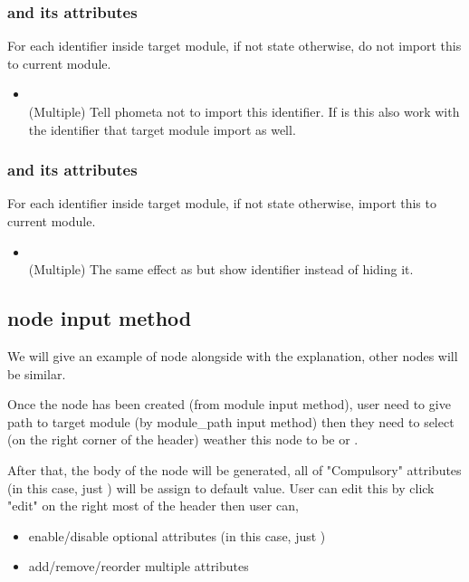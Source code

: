 \documentclass[master.tex]{subfiles}
\begin{document}
\subsubsection{\kShowByDefault and its attributes}
For each identifier inside target module, if not state otherwise, do not import this to current module.
\begin{itemize}
    \item \kHide {} \\
    (Multiple) Tell phometa not to import this identifier. If \kRecursive is \kTrue this also work with the identifier that target module import as well.
\end{itemize}

\subsubsection{\kHideByDefault and its attributes}
For each identifier inside target module, if not state otherwise, import this to current module.
\begin{itemize}
    \item \kShow {} \\
    (Multiple) The same effect as \kHide but show identifier instead of hiding it.
\end{itemize}

\subsection{node input method}

We will give an example of \kOpen node alongside with the explanation, other nodes will be similar.

Once the \kOpen node has been created (from module input method), user need to give path to target module (by module\_path input method) then they need to select (on the right corner of the header) weather this \kOpen node to be \kShowByDefault or \kHideByDefault.

After that, the body of the node will be generated, all of "Compulsory" attributes (in this case, just \kRecursive) will be assign to default value. User can edit this by click "edit" on the right most of the header then user can,

\begin{itemize}
    \item enable/disable optional attributes (in this case, just \kComment)
    \item add/remove/reorder multiple attributes
\end{itemize}
\end{document}
